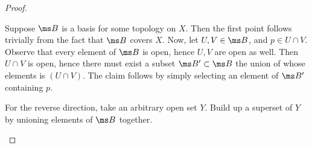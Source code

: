\begin{proof}~
  \begin{iffproof}
    \item Suppose $\ms B$ is a basis for some topology on $X$. Then the first
      point follows trivially from the fact that $\ms B$ covers $X$. Now, let
      $U, V \in \ms B$, and $p \in U \cap V$. Observe that every element of $\ms
      B$ is open, hence $U,V$ are open as well. Then $U \cap V$ is open, hence
      there must exist a subset $\ms B' \subset \ms B$ the union of whose
      elements is $(U \cap V)$. The claim follows by simply selecting an element
      of $\ms B'$ containing $p$.
    \item For the reverse direction, take an arbitrary open set $Y$. Build up a
      superset of $Y$ by unioning elements of $\ms B$ together.
  \end{iffproof}
\end{proof}
